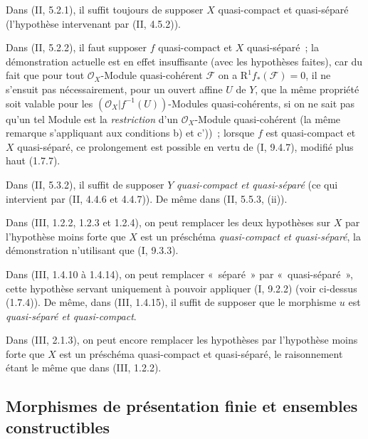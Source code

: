 \begin{env}[1.7.17]
\label{IV.1.7.17-fr}
Dans (II, 5.2.1), il suffit toujours de supposer $X$ quasi-compact et
quasi-séparé (l'hypothèse intervenant par (II, 4.5.2)).
\end{env}

\begin{env}[1.7.18]
\label{IV.1.7.18-fr}
Dans (II, 5.2.2), il faut supposer $f$ quasi-compact et $X$ quasi-séparé~; la
démonstration actuelle est en effet insuffisante (avec les hypothèses faites),
car du fait que pour tout $\mathcal O_X$-Module quasi-cohérent $\mathcal F$ on
a $\mathrm R^1f_*(\mathcal F)=0$, il ne s'ensuit pas nécessairement, pour un
ouvert affine $U$ de $Y$, que la même propriété soit valable pour les
$(\mathcal O_X|f^{-1}(U))$-Modules quasi-cohérents, si on ne sait pas qu'un tel
Module est la \emph{restriction} d'un $\mathcal O_X$-Module quasi-cohérent (la
même remarque s'appliquant aux conditions b) et c'))~; lorsque $f$ est
quasi-compact et $X$ quasi-séparé, ce prolongement est possible en vertu de
(I, 9.4.7), modifié plus haut (1.7.7).
\end{env}

\begin{env}[1.7.19]
\label{IV.1.7.19-fr}
Dans (II, 5.3.2), il suffit de supposer $Y$ \emph{quasi-compact et
quasi-séparé} (ce qui intervient par (II, 4.4.6 et 4.4.7)). De même dans (II,
5.5.3, (ii)).
\end{env}

\begin{env}[1.7.20]
\label{IV.1.7.20-fr}
Dans (III, 1.2.2, 1.2.3 et 1.2.4), on peut remplacer les deux hypothèses sur
$X$ par l'hypothèse moins forte que $X$ est un préschéma \emph{quasi-compact
et quasi-séparé}, la démonstration n'utilisant que (I, 9.3.3).
\end{env}

\begin{env}[1.7.21]
\label{IV.1.7.21-fr}
Dans (III, 1.4.10 à 1.4.14), on peut remplacer «~séparé~» par
«~quasi-séparé~», cette hypothèse servant uniquement à pouvoir appliquer (I,
9.2.2) (voir ci-dessus (1.7.4)). De même, dans (III, 1.4.15), il suffit de
supposer que le morphisme $u$ est \emph{quasi-séparé et quasi-compact}.
\end{env}

\begin{env}[1.7.22]
\label{IV.1.7.22-fr}
Dans (III, 2.1.3), on peut encore remplacer les hypothèses par l'hypothèse
moins forte que $X$ est un préschéma quasi-compact et quasi-séparé, le
raisonnement étant le même que dans (III, 1.2.2).
\end{env}

\subsection{Morphismes de présentation finie et ensembles constructibles}
\label{subsection:IV.1.8-fr}

